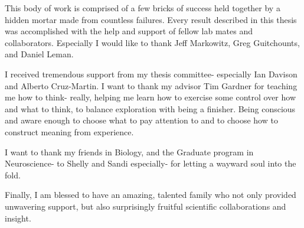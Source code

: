 







This body of work is comprised of a few bricks of success held together by a hidden mortar made from countless failures. Every result described in this thesis was accomplished with the help and support of fellow lab mates and collaborators. Especially I would like to thank Jeff Markowitz, Greg Guitchounts, and Daniel Leman.

I received tremendous support from my thesis committee- especially Ian Davison and Alberto Cruz-Martin. I want to thank my advisor Tim Gardner for teaching me how to think- really, helping me learn how to exercise some control over how and what to think, to balance exploration with being a finisher. Being conscious and aware enough to choose what to pay attention to and to choose how to construct meaning from experience. 

I want to thank my friends in Biology, and the Graduate program in Neuroscience- to Shelly and Sandi especially- for letting a wayward soul into the fold. 

Finally, I am blessed to have an amazing, talented family who not only provided unwavering support, but also surprisingly fruitful scientific collaborations and insight. 

\vskip 1in


